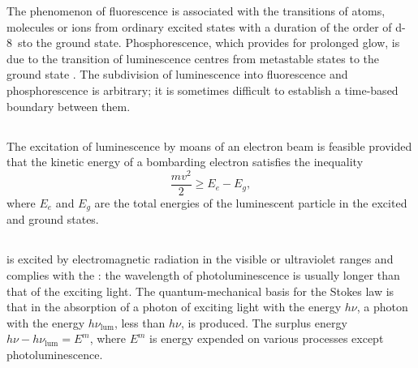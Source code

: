 The phenomenon of fluorescence is associated with the transitions of atoms, molecules or ions from ordinary excited states with a duration of the order of \SI{d-8}{\second}to the ground state. Phosphorescence, which provides for prolonged glow, is due to the transition of luminescence centres from metastable states to the ground state . The subdivision of luminescence into fluorescence and phosphorescence is arbitrary; it is sometimes difficult to establish a time-based boundary between them.

\subsection{}\label{39.7.4} The excitation of luminescence by moans of an electron beam is feasible provided that the kinetic energy of a bombarding electron satisfies the inequality
\begin{equation*}%
\frac{mv^{2}}{2} \geqslant E_{e} - E_{g},
\end{equation*}
where $E_{e}$ and $E_{g}$ are the total energies of the luminescent particle in the excited and ground states.

\subsection{}\label{39.7.5}  is excited by electromagnetic radiation in the visible or ultraviolet ranges and complies with the : the wavelength of photoluminescence is usually longer than that of the exciting light. The quantum-mechanical basis for the Stokes law is that in the absorption of a photon of exciting light with the energy $h \nu$, a photon with the energy $h \nu_{\mathrm{lum}}$, less than $h \nu$, is produced. The surplus energy $h \nu - h \nu_{\mathrm{lum}} = E^{m}$, where $E^{m}$ is
energy expended on various processes except photoluminescence.

